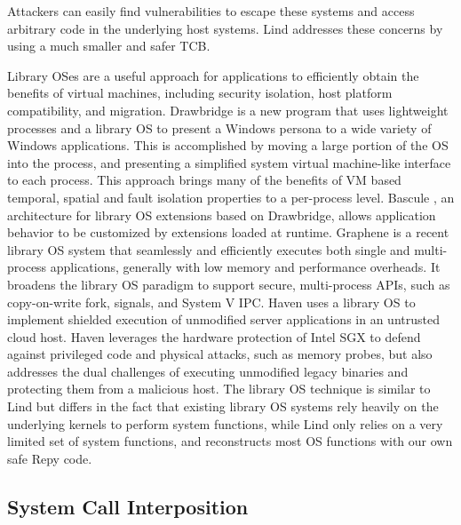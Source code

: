 Attackers can easily find vulnerabilities to escape these systems and access arbitrary code in the underlying host systems. Lind addresses these concerns by using a much smaller and safer TCB.

Library OSes are a useful approach for applications to efficiently obtain the benefits of virtual machines, 
including security isolation, host platform compatibility, and migration. Drawbridge \cite{Drawbridge-11} is a new program 
that uses lightweight processes and a library OS to present a Windows persona to a wide variety of Windows applications. 
This is accomplished by moving a large portion of the OS into the process, and presenting a simplified system 
virtual machine-like interface to each process. This approach brings many of the benefits of VM based temporal, 
spatial and fault isolation properties to a per-process level. Bascule \cite{Bascule}, an architecture for library OS extensions 
based on Drawbridge, allows application behavior to be customized by extensions loaded at runtime. 
Graphene \cite{Graphene-14} is a recent library OS system that seamlessly and efficiently executes both single and 
multi-process applications, generally with low memory and performance overheads. 
It broadens the library OS paradigm to support secure, multi-process APIs, such as copy-on-write fork, signals, 
and System V IPC. Haven \cite{Haven} uses a library OS to implement shielded execution of unmodified server applications 
in an untrusted cloud host. Haven leverages the hardware protection of Intel SGX to defend against 
privileged code and physical attacks, such as memory probes, but also addresses the dual challenges of 
executing unmodified legacy binaries and protecting them from a malicious host. 
The library OS technique is similar to Lind but differs in the fact that existing library OS systems rely heavily on 
the underlying kernels to perform system functions, while Lind only relies on a very limited set of system functions, 
and reconstructs most OS functions with our own safe Repy code. 

\subsection{System Call Interposition}

